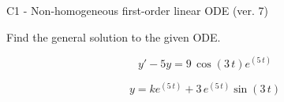 \begin{exercise}
  \begin{exerciseTitle}C1 - Non-homogeneous first-order linear ODE (ver. 7)\end{exerciseTitle}
  \begin{exerciseStatement}
    
Find the general solution to the given ODE.

    
\[y'-5y= 9 \, \cos\left(3 \, t\right) e^{\left(5 \, t\right)}\]

  \end{exerciseStatement}
  \begin{exerciseAnswer}
    
\[y= k e^{\left(5 \, t\right)} + 3 \, e^{\left(5 \, t\right)} \sin\left(3 \, t\right)\]

  \end{exerciseAnswer}
\end{exercise}